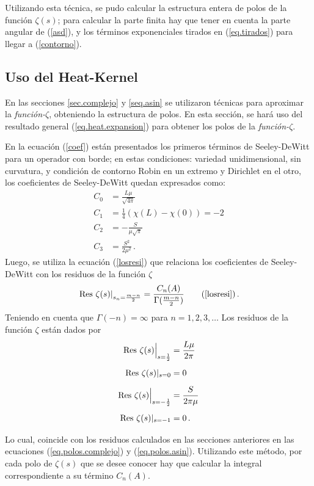 Utilizando esta técnica, se pudo calcular la estructura entera de polos de la función $\zeta (s)$; para calcular la parte finita hay que tener en cuenta la parte angular de (\ref{asd}), y los términos exponenciales tirados en (\ref{eq.tirados}) para llegar a (\ref{contorno}).


\subsection{Uso del Heat-Kernel}

En las secciones \ref{sec.complejo} y \ref{seq.asin} se utilizaron técnicas para aproximar la {\it función-$\zeta$}, obteniendo la estructura de polos. En esta sección, se hará uso del resultado general (\ref{eq.heat.expansion}) para obtener los polos de la {\it función-$\zeta$}.

En la ecuación (\ref{coef}) están presentados los primeros términos de Seeley-DeWitt para un operador con borde; en estas condiciones: variedad unidimensional, sin curvatura, y condición de contorno Robin en un extremo y Dirichlet en el otro, los coeficientes de Seeley-DeWitt quedan expresados como:
\begin{equation}
\begin{aligned}
C _0 &=  \frac{L \mu}{\sqrt{4 \pi} }\\
C _1 &=  \frac{1}{4} \left( \chi (L) - \chi (0) \right) =  -2 \\
C _2 &= - \frac{S}{\mu \sqrt{\pi} } \\
C _3 &= \frac{ S ^2 }{2 \mu ^2 }
\, .
\end{aligned}
\end{equation}
Luego, se utiliza la ecuación (\ref{losresi}) que relaciona los coeficientes de Seeley-DeWitt con los residuos de la función $\zeta$
\begin{equation}
\left. {\rm Res} \ \zeta  (s)  \right| _{s_n= \frac{m - n}{2}} =  
\frac{ C_n  (A) }{ {\Gamma ( \frac{m-n}{2}} ) }
\tag{\ref{losresi}}
\, .
\end{equation}
Teniendo en cuenta que $\Gamma (-n) = \infty$ para $n = 1,2,3, \dots  $ Los residuos de la función $\zeta$ están dados por
\begin{equation}
\begin{aligned}
{\rm Res} \  \zeta  (s)  \Big| _{s=\frac{1}{2}} &= \frac{L \mu}{2 \pi} \\[5pt]
{\rm Res} \  \zeta  (s)  | _{s=0} &= 0 \\[5pt]
{\rm Res} \ \zeta (s) \Big| _{s= - \frac{1}{2}} &= \frac{S}{2 \pi \mu} \\[5pt]
{\rm Res} \  \zeta  (s) | _{s=-1} &= 0 \, . \\[5pt]
\end{aligned}
\end{equation}
Lo cual, coincide con los residuos calculados en las secciones anteriores en las ecuaciones (\ref{eq.polos.complejo}) y (\ref{eq.polos.asin}). Utilizando este método, por cada polo de $\zeta (s)$ que se desee conocer hay que calcular la integral correspondiente a su término $C _n (A)$.

